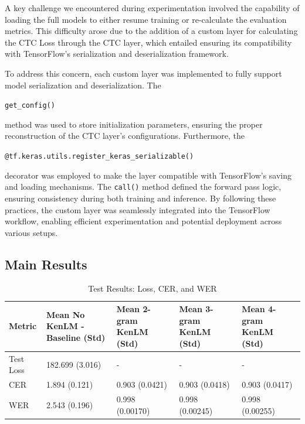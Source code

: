 \documentclass[conference]{IEEEtran}
\newcounter{customsubsubsection} %
\let\oldsubsection\subsection
\renewcommand{\subsection}[1]{%
  \oldsubsection{#1}%
  \setcounter{customsubsubsection}{0}%
}
\begin{document}
A key challenge we encountered during experimentation involved the capability of loading the full models to either resume training or re-calculate the evaluation metrics. This difficulty arose due to the addition of a custom layer for calculating the CTC Loss through the CTC layer, which entailed ensuring its compatibility with TensorFlow’s serialization and deserialization framework.

To address this concern, each custom layer was implemented to fully support model serialization and deserialization. The \begin{small}\texttt{get\_config()}\end{small} method was used to store initialization parameters, ensuring the proper reconstruction of the CTC layer’s configurations. Furthermore, the \begin{small}\texttt{@tf.keras.utils.register\_keras\_serializable()}\end{small} decorator was employed to make the layer compatible with TensorFlow’s saving and loading mechanisms. The \texttt{call()} method defined the forward pass logic, ensuring consistency during both training and inference. By following these practices, the custom layer was seamlessly integrated into the TensorFlow workflow, enabling efficient experimentation and potential deployment across various setups.

\subsection{Main Results}

\begin{table}[t]
  \centering
  \caption{Test Results: Loss, CER, and WER}
  \label{tab:test_results}
  \begin{tabular}{lllll}
  \toprule
     Metric &                Mean No KenLM - Baseline (Std) &      Mean 2-gram KenLM (Std) &      Mean 3-gram KenLM (Std) &                 Mean 4-gram KenLM (Std) \\
  \midrule
  Test Loss & 182.699 (3.016) &                            - &                            - &                                       - \\
        CER &               1.894 (0.121) &               0.903 (0.0421) &              0.903 (0.0418) &                      0.903 (0.0417) \\
        WER &            2.543 (0.196) & 0.998 (0.00170) & 0.998 (0.00245) & 0.998 (0.00255) \\
  \bottomrule
  \end{tabular}
\end{table}
\end{document}
